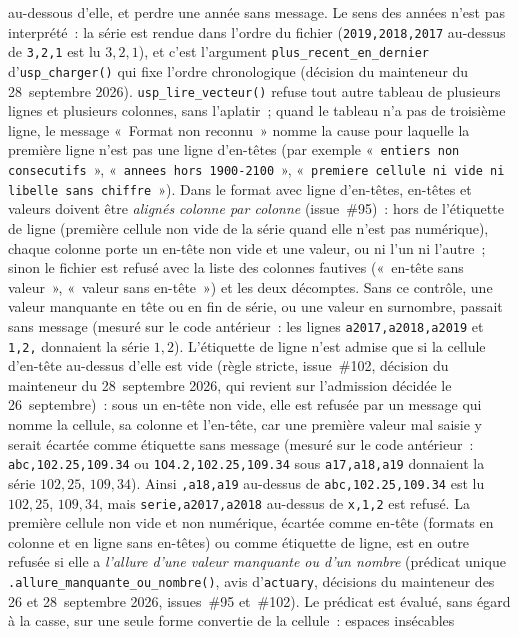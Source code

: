 \documentclass[a4paper,11pt]{article}
\newcommand{\code}[1]{\texttt{\small #1}}
\begin{document}
au-dessous d'elle, et perdre une année sans message. Le sens des années n'est pas interprété~: la
série est rendue dans l'ordre du fichier (\code{2019,2018,2017} au-dessus de \code{3,2,1} est lu
$3, 2, 1$), et c'est l'argument \code{plus\_recent\_en\_dernier} d'\code{usp\_charger()} qui fixe
l'ordre chronologique (décision du mainteneur du 28~septembre 2026). \code{usp\_lire\_vecteur()}
refuse tout autre tableau de plusieurs lignes et plusieurs colonnes, sans l'aplatir~; quand le
tableau n'a pas de troisième ligne, le message «~Format non reconnu~» nomme la cause pour laquelle la
première ligne n'est pas une ligne d'en-têtes (par exemple «~\code{entiers non consecutifs}~»,
«~\code{annees hors 1900-2100}~», «~\code{premiere cellule ni vide ni libelle sans chiffre}~»).
Dans le format avec ligne d'en-têtes, en-têtes et valeurs doivent être \emph{alignés colonne
par colonne} (issue~\#95)~: hors de l'étiquette de ligne (première cellule non vide de la
série quand elle n'est pas numérique), chaque
colonne porte un en-tête non vide et une valeur, ou ni l'un ni l'autre~; sinon le fichier est
refusé avec la liste des colonnes fautives («~en-tête sans valeur~», «~valeur sans en-tête~») et
les deux décomptes. Sans ce contrôle, une valeur manquante en tête ou en fin de série, ou une
valeur en surnombre, passait sans message (mesuré sur le code antérieur~: les lignes
\code{a2017,a2018,a2019} et \code{1,2,} donnaient la série $1, 2$). L'étiquette de ligne n'est
admise que si la cellule d'en-tête au-dessus d'elle est vide (règle stricte, issue~\#102,
décision du mainteneur du 28~septembre 2026, qui revient sur l'admission décidée le
26~septembre)~: sous un en-tête non vide, elle est refusée par un message qui nomme la cellule,
sa colonne et l'en-tête, car une première valeur mal saisie y serait écartée comme étiquette sans
message (mesuré sur le code antérieur~: \code{abc,102.25,109.34} ou \code{1O4.2,102.25,109.34}
sous \code{a17,a18,a19} donnaient la série $102{,}25$, $109{,}34$). Ainsi \code{,a18,a19}
au-dessus de \code{abc,102.25,109.34} est lu $102{,}25$, $109{,}34$, mais \code{serie,a2017,a2018}
au-dessus de \code{x,1,2} est refusé. La première cellule non vide
et non numérique, écartée comme en-tête (formats en colonne et en ligne sans en-têtes) ou comme
étiquette de ligne, est en outre refusée si elle a \emph{l'allure d'une valeur manquante ou d'un
nombre} (prédicat unique \code{.allure\_manquante\_ou\_nombre()}, avis d'\code{actuary},
décisions du mainteneur des 26 et 28~septembre 2026, issues~\#95 et~\#102). Le prédicat est
évalué, sans égard à la casse, sur une seule forme convertie de la cellule~: espaces insécables
\end{document}
